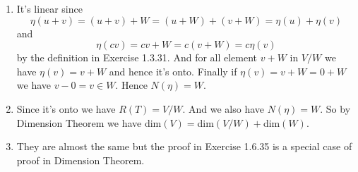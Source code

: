 \begin{enumerate}
\begin{enumerate}
\item It's linear since \[\eta(u+v)=(u+v)+W=(u+W)+(v+W)=\eta(u)+\eta(v)\] and \[\eta(cv)=cv+W=c(v+W)=c\eta(v)\] by the definition in Exercise 1.3.31. And for all element $v+W$ in $V/W$ we have $\eta(v)=v+W$ and hence it's onto. Finally if $\eta(v)=v+W=0+W$ we have $v-0=v\in W$. Hence $N(\eta )=W$.
\item Since it's onto we have $R(T)=V/W$. And we also have $N(\eta )=W$. So by Dimension Theorem we have dim$(V)=$dim$(V/W)+$dim$(W)$.
\item They are almost the same but the proof in Exercise 1.6.35 is a special case of proof in Dimension Theorem.
\end{enumerate}
\end{enumerate}